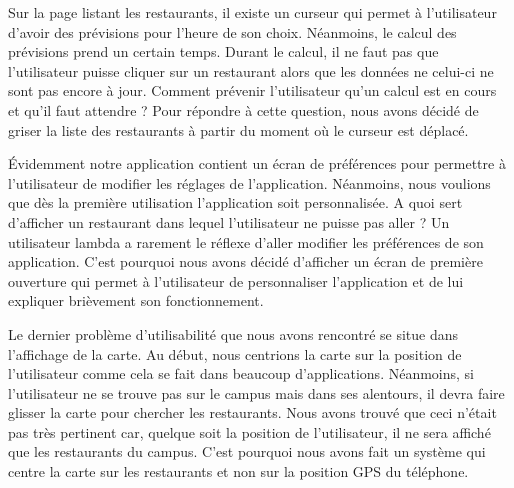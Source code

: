  
 
Sur la page listant les restaurants, il existe un curseur qui permet à l'utilisateur
d'avoir des prévisions pour l'heure de son choix. Néanmoins, le calcul des
prévisions prend un certain temps. Durant le calcul, il ne faut pas que l'utilisateur 
puisse cliquer sur un restaurant alors que les données ne celui-ci ne sont pas
encore à jour. Comment prévenir l'utilisateur qu'un calcul est en cours et qu'il 
faut attendre ? Pour répondre à cette question, nous avons décidé de griser la 
liste des restaurants à partir du moment où le curseur est déplacé. 

Évidemment notre application contient un écran de préférences pour permettre
à l'utilisateur de modifier les réglages de l'application. Néanmoins, nous 
voulions que dès la première utilisation l'application soit personnalisée. A 
quoi sert d'afficher un restaurant dans lequel l'utilisateur ne puisse pas aller ?
Un utilisateur lambda a rarement le réflexe d'aller modifier les préférences de
son application. C'est pourquoi nous avons décidé d'afficher un écran de première
ouverture qui permet à l'utilisateur de personnaliser l'application et de lui
expliquer brièvement son fonctionnement.

Le dernier problème d'utilisabilité que nous avons rencontré se situe
dans l'affichage de la carte. Au début, nous centrions la carte sur la 
position de l'utilisateur comme cela se fait dans beaucoup d'applications. 
Néanmoins, si l'utilisateur ne se trouve pas sur le campus mais dans ses
alentours, il devra faire glisser la carte pour chercher les restaurants. 
Nous avons trouvé que ceci n'était pas très pertinent car, quelque soit la
position de l'utilisateur, il ne sera affiché que les restaurants du campus. 
C'est pourquoi nous avons fait un système qui centre la carte sur les restaurants
et non sur la position GPS du téléphone. 
  